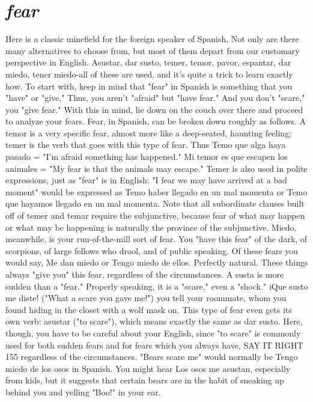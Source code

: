 \documentclass[14pt,a4paper,oneside]{memoir}
\begin{document}
{{{{\section{\emph{fear}}

Here is a classic minefield for the foreign speaker of Spanish,
Not only are there many alternatives to choose from, but most of them
depart from our customary perspective in English. Asustar, dar susto,
temer, temor, pavor, espantar, dar miedo, tener miedo-all of these
are used, and it's quite a trick to learn exactly how.
To start with, keep in mind that "fear" in Spanish is something that you "have" or "give," Thus, you aren't "afraid" but "have
fear." And you don't "scare," you "give fear." With this in mind, lie
down on the couch over there and proceed to analyze your fears. Fear,
in Spanish, can be broken down roughly as follows. A temor is a very
specific fear, almost more like a deep-seated, haunting feeling; temer
is the verb that goes with this type of fear. Thus Temo que alga haya
pasado = "I'm afraid something has happened." Mi temor es que escapen los animales = "My fear is that the animals may escape." Temer
is also used in polite expressions, just as "fear" is in English: "I fear we
may have arrived at a bad moment" would be expressed as Temo haber
llegado en un mal momenta or Temo que hayamos llegado en un mal
momenta. Note that all subordinate clauses built off of temer and temar require the subjunctive, because fear of what may happen or what
may be happening is naturally the province of the subjunctive.
Miedo, meanwhile, is your run-of-the-mill sort of fear. You
"have this fear" of the dark, of scorpions, of large fellows who drool,
and of public speaking. Of these fears you would say, Me dan miedo
or Tengo miedo de ellos. Perfectly natural. These things always "give
you" this fear, regardless of the circumstances.
A susta is more sudden than a "fear." Properly speaking, it is a
"scare," even a "shock." iQue susto me diste! ("What a scare you gave
me!") you tell your roommate, whom you found hiding in the closet
with a wolf mask on. This type of fear even gets its own verb: asustar
("to scare"), which means exactly the same as dar susto. Here, though,
you have to be careful about your English, since "to scare" is commonly used for both sudden fears and for fears which you always have,
SAY IT RIGHT 155
regardless of the circumstances. "Bears scare me" would normally
be Tengo miedo de los osos in Spanish. You might hear Los osos me
asustan, especially from kids, but it suggests that certain bears are in
the habit of sneaking up behind you and yelling "Boo!" in your ear.
}}}}
\end{document}
